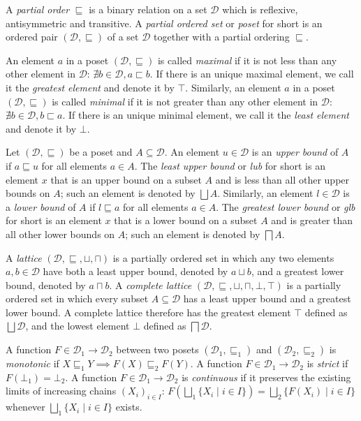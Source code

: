\documentclass[a4paper]{book}
\begin{document}
A \emph{partial order} $\sqsubseteq$ is a binary relation on a set
$\mathcal{D}$ which is reflexive, antisymmetric and transitive.  A
\emph{partial ordered set} or \emph{poset} for short is an ordered
pair $(\mathcal{D}, \sqsubseteq)$ of a set $\mathcal{D}$ together with
a partial ordering $\sqsubseteq$.

An element $a$ in a poset $(\mathcal{D}, \sqsubseteq)$ is called
\emph{maximal} if it is not less than any other element in
$\mathcal{D}$: $\nexists b \in \mathcal{D}, a \sqsubset b$.  If there
is an unique maximal element, we call it the \emph{greatest element}
and denote it by $\top$.  Similarly, an element $a$ in a poset
$(\mathcal{D}, \sqsubseteq)$ is called \emph{minimal} if it is not
greater than any other element in $\mathcal{D}$: $\nexists b \in
\mathcal{D}, b \sqsubset a$.  If there is an unique minimal element,
we call it the \emph{least element} and denote it by $\bot$.

Let $(\mathcal{D}, \sqsubseteq)$ be a poset and $A \subseteq
\mathcal{D}$.  An element $u \in \mathcal{D}$ is an \emph{upper bound}
of $A$ if $a \sqsubseteq u$ for all elements $a \in A$. The
\emph{least upper bound} or \emph{lub} for short is an element $x$
that is an upper bound on a subset $A$ and is less than all other
upper bounds on $A$; such an element is denoted by $\bigsqcup A$.
Similarly, an element $l \in \mathcal{D}$ is a \emph{lower bound} of
$A$ if $l \sqsubseteq a$ for all elements $a \in A$. The
\emph{greatest lower bound} or \emph{glb} for short is an element $x$
that is a lower bound on a subset $A$ and is greater than all other
lower bounds on $A$; such an element is denoted by $\bigsqcap A$.

A \emph{lattice} $(\mathcal{D}, \sqsubseteq, \sqcup, \sqcap)$ is a
partially ordered set in which any two elements $a, b \in \mathcal{D}$
have both a least upper bound, denoted by $a \sqcup b$, and a greatest
lower bound, denoted by $a \sqcap b$.  A \emph{complete lattice}
$(\mathcal{D}, \sqsubseteq, \sqcup, \sqcap, \bot, \top)$ is a
partially ordered set in which every subset $A \subseteq \mathcal{D}$
has a least upper bound and a greatest lower bound.  A complete
lattice therefore has the greatest element $\top$ defined as
$\bigsqcup \mathcal{D}$, and the lowest element $\bot$ defined as
$\bigsqcap \mathcal{D}$.

A function $F \in \mathcal{D}_1 \to \mathcal{D}_2$ between two posets
$(\mathcal{D}_1, \sqsubseteq_1)$ and $(\mathcal{D}_2, \sqsubseteq_2)$
is \emph{monotonic} if $X \sqsubseteq_1 Y \implies F(X) \sqsubseteq_2
F(Y)$.  A function $F \in \mathcal{D}_1 \to \mathcal{D}_2$ is
\emph{strict} if $F(\bot_1) = \bot_2$.  A function $F \in
\mathcal{D}_1 \to \mathcal{D}_2$ is \emph{continuous} if it preserves
the existing limits of increasing chains $(X_i)_{i \in I}$:
$F(\bigsqcup_1 \{ X_i \mid i \in I \}) = \bigsqcup_2 \{ F(X_i) \mid i
\in I \}$ whenever $\bigsqcup_1 \{ X_i \mid i \in I \}$ exists.
\end{document}
